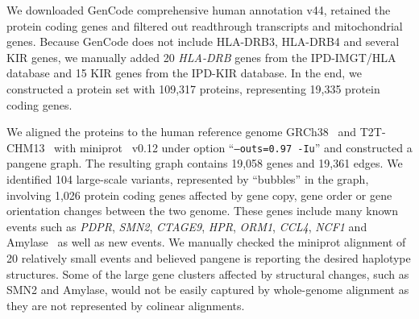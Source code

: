 \documentclass[webpdf,contemporary,large,namedate]{oup-authoring-template}%
\begin{document}
We downloaded GenCode comprehensive human annotation v44,
retained the protein coding genes and filtered out readthrough transcripts and mitochondrial genes.
Because GenCode does not include HLA-DRB3, HLA-DRB4 and several KIR genes,
we manually added 20 {\it HLA-DRB} genes from the IPD-IMGT/HLA database and
15 KIR genes from the IPD-KIR database.
In the end, we constructed a protein set with 109,317 proteins, representing 19,335 protein coding genes.

We aligned the proteins to the human reference genome GRCh38~\citep{Schneider:2017aa} and T2T-CHM13~\citep{Nurk:2022up}
with miniprot~\citep{Li:2023ac} v0.12 under option ``{\tt --outs=0.97 -Iu}''
and constructed a pangene graph.
The resulting graph contains 19,058 genes and 19,361 edges.
We identified 104 large-scale variants, represented by ``bubbles'' in the graph,
involving 1,026 protein coding genes affected by gene copy, gene order or gene orientation changes between the two genome.
These genes include many known events such as {\it PDPR}, {\it SMN2}, {\it CTAGE9}, {\it HPR}, {\it ORM1}, {\it CCL4}, {\it NCF1} and Amylase~\citep{Handsaker:2015ur,Sudmant:2010aa}
as well as new events.
We manually checked the miniprot alignment of 20 relatively small events
and believed pangene is reporting the desired haplotype structures.
Some of the large gene clusters affected by structural changes, such as SMN2 and Amylase,
would not be easily captured by whole-genome alignment as they are not represented by colinear alignments.
\end{document}
